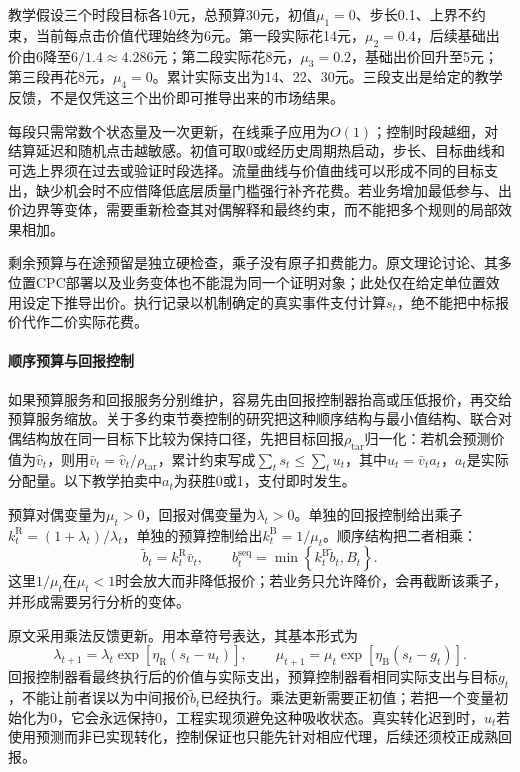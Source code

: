教学假设三个时段目标各10元，总预算30元，初值$\mu_1=0$、步长0.1、上界不约束，当前每点击价值代理始终为6元。第一段实际花14元，$\mu_2=0.4$，后续基础出价由6降至$6/1.4\approx4.286$元；第二段实际花8元，$\mu_3=0.2$，基础出价回升至5元；第三段再花8元，$\mu_4=0$。累计实际支出为14、22、30元。三段支出是给定的教学反馈，不是仅凭这三个出价即可推导出来的市场结果。

每段只需常数个状态量及一次更新，在线乘子应用为$O(1)$；控制时段越细，对结算延迟和随机点击越敏感。初值可取0或经历史周期热启动，步长、目标曲线和可选上界须在过去或验证时段选择。流量曲线与价值曲线可以形成不同的目标支出，缺少机会时不应借降低底层质量门槛强行补齐花费。若业务增加最低参与、出价边界等变体，需要重新检查其对偶解释和最终约束，而不能把多个规则的局部效果相加。

剩余预算与在途预留是独立硬检查，乘子没有原子扣费能力。原文理论讨论、其多位置CPC部署以及业务变体也不能混为同一个证明对象；此处仅在给定单位置效用设定下推导出价。执行记录以机制确定的真实事件支付计算$s_t$，绝不能把中标报价代作二价实际花费。

\paragraph{顺序预算与回报控制}
\label{sec:rs-advertising-sequential-pacing}

如果预算服务和回报服务分别维护，容易先由回报控制器抬高或压低报价，再交给预算服务缩放。关于多约束节奏控制的研究把这种顺序结构与最小值结构、联合对偶结构放在同一目标下比较为保持口径，先把目标回报$\rho_{\mathrm{tar}}$归一化：若机会预测价值为$\widehat v_t$，则用$\bar v_t=\widehat v_t/\rho_{\mathrm{tar}}$，累计约束写成$\sum_ts_t\leq\sum_tu_t$，其中$u_t=\bar v_t a_t$，$a_t$是实际分配量。以下教学拍卖中$a_t$为获胜0或1，支付即时发生。

预算对偶变量为$\mu_t>0$，回报对偶变量为$\lambda_t>0$。单独的回报控制给出乘子$k_t^{\mathrm{R}}=(1+\lambda_t)/\lambda_t$，单独的预算控制给出$k_t^{\mathrm{B}}=1/\mu_t$。顺序结构把二者相乘：
\begin{equation}
  \widetilde b_t=k_t^{\mathrm{R}}\bar v_t,\qquad
  b_t^{\mathrm{seq}}
    =\min\!\left\{k_t^{\mathrm{B}}\widetilde b_t,B_t\right\}.
  \label{eq:rs-advertising-sequential}
\end{equation}
这里$1/\mu_t$在$\mu_t<1$时会放大而非降低报价；若业务只允许降价，会再截断该乘子，并形成需要另行分析的变体。

原文采用乘法反馈更新。用本章符号表达，其基本形式为
\begin{equation}
  \lambda_{t+1}
   =\lambda_t\exp[\eta_{\mathrm{R}}(s_t-u_t)],\qquad
  \mu_{t+1}
   =\mu_t\exp[\eta_{\mathrm{B}}(s_t-g_t)].
  \label{eq:rs-advertising-two-dual-update}
\end{equation}
回报控制器看最终执行后的价值与实际支出，预算控制器看相同实际支出与目标$g_t$，不能让前者误以为中间报价$\widetilde b_t$已经执行。乘法更新需要正初值；若把一个变量初始化为0，它会永远保持0，工程实现须避免这种吸收状态。真实转化迟到时，$u_t$若使用预测而非已实现转化，控制保证也只能先针对相应代理，后续还须校正成熟回报。

